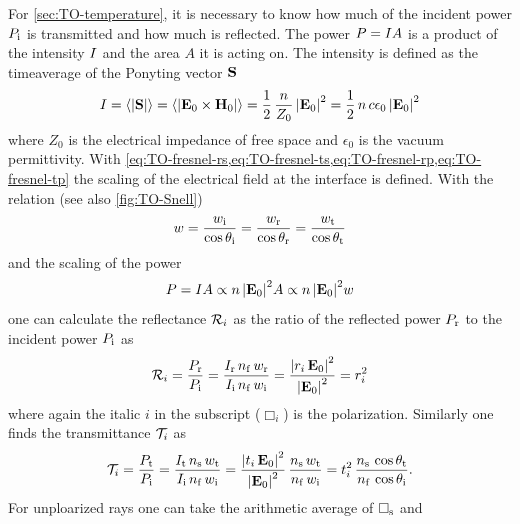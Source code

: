 For \cref{sec:TO-temperature}, it is necessary to know how much of the incident 
power $P_{\mathrm{i}}$ is transmitted and how much is reflected. The power 
$P=I A$ is a product of the intensity $I$ and the area $A$ it 
is acting on. The intensity is defined as the timeaverage of the Ponyting 
vector $\vb{S}$
\begin{equation}
  I = \left\langle \abs{\vb{S}} \right\rangle = 
  \left\langle \abs{\vb{E}_{0}\times\vb{H}_{0}} \right\rangle = 
  \frac{1}{2}\,\frac{n}{Z_{0}}\,\abs{\vb{E}_{0}}^{2} = 
  \frac{1}{2}\,n\,c\epsilon_{0}\,\abs{\vb{E}_{0}}^{2}
\end{equation}
where $Z_{0}$ is the electrical impedance of free space and $\epsilon_{0}$ is 
the vacuum permittivity. With 
\cref{eq:TO-fresnel-rs,eq:TO-fresnel-ts,eq:TO-fresnel-rp,eq:TO-fresnel-tp} the 
scaling of the electrical field at the interface is defined. With the relation 
(see also \cref{fig:TO-Snell})
\begin{equation}
  w = \frac{w_{\mathrm{i}}}{\cos\theta_{\mathrm{i}}} = \frac{w_{\mathrm{r}}}{\cos\theta_{\mathrm{r}}} = 
  \frac{w_{\mathrm{t}}}{\cos\theta_{\mathrm{t}}}
  \label{eq:TO-area}
\end{equation}
and the scaling of the power
\begin{equation}
  P = I A \propto n\,\abs{\vb{E}_{0}}^{2}A \propto
  n\,\abs{\vb{E}_{0}}^{2}w
\end{equation}
one can calculate the reflectance $\mathcal{R}_{i}$ as the ratio of the reflected 
power $P_{\mathrm{r}}$ to the incident power $P_{\mathrm{i}}$ as
\begin{equation}
  \mathcal{R}_{i} = \frac{P_{\mathrm{r}}}{P_{\mathrm{i}}} = 
  \frac{I_{\mathrm{r}}\,n_{\mathrm{f}}\,w_{\mathrm{r}}}{I_{\mathrm{i}}\,n_{\mathrm{f}}\,w_{\mathrm{i}}} 
  =\frac{\abs{r_{i}\,\vb{E}_{0}}^{2}}{\abs{\vb{E}_{0}}^{2}} = 
  r_{i}^{2}
  \label{eq:TO-fresnelR}
\end{equation}
where again the italic $i$ in the subscript ($\Box_{i}$) is the polarization. 
Similarly one finds the transmittance $\mathcal{T}_{i}$ as
\begin{equation}
  \mathcal{T}_{i} = \frac{P_{\mathrm{t}}}{P_{\mathrm{i}}} = 
  \frac{I_{\mathrm{t}}\,n_{\mathrm{s}}\,w_{\mathrm{t}}}{I_{\mathrm{i}}\,n_{\mathrm{f}}\,w_{\mathrm{i}}} 
  =\frac{\abs{t_{i}\,\vb{E}_{0}}^{2}}{\abs{\vb{E}_{0}}^{2}}\,\frac{n_{\mathrm{s}}\,w_{\mathrm{t}}}{n_{\mathrm{f}}\,w_{\mathrm{i}}} 
  = t_{i}^{2}\,\frac{n_{\mathrm{s}}\,\cos\theta_{\mathrm{t}}}{n_{\mathrm{f}}\,\cos\theta_{\mathrm{i}}}.
  \label{eq:TO-fresnelT}
\end{equation}
For unploarized rays one can take the arithmetic average of $\Box_{\mathrm{s}}$ and 
